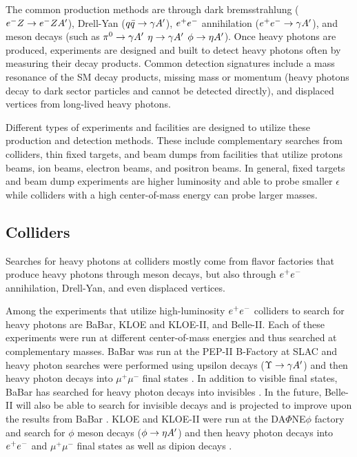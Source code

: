 The common production methods are through dark bremsstrahlung ($e^-Z \rightarrow e^- Z A^\prime$), Drell-Yan ($q\bar{q} \rightarrow \gamma A^\prime$), $e^{+}e^{-}$ annihilation ($e^{+}e^{-} \rightarrow \gamma A^\prime$), and meson decays (such as $\pi^0 \rightarrow \gamma A^\prime$ $\eta \rightarrow \gamma A^\prime$ $\phi \rightarrow \eta A^\prime$). Once heavy photons are produced, experiments are designed and built to detect heavy photons often by measuring their decay products. Common detection signatures include a mass resonance of the SM decay products, missing mass or momentum (heavy photons decay to dark sector particles and cannot be detected directly), and displaced vertices from long-lived heavy photons. 

Different types of experiments and facilities are designed to utilize these production and detection methods. These include complementary searches from colliders, thin fixed targets, and beam dumps from facilities that utilize protons beams, ion beams, electron beams, and positron beams. In general, fixed targets and beam dump experiments are higher luminosity and able to probe smaller $\epsilon$ while colliders with a high center-of-mass energy can probe larger masses.

\subsection{Colliders}\label{sec:colliders}

Searches for heavy photons at colliders mostly come from flavor factories that produce heavy photons through meson decays, but also through $e^{+}e^{-}$ annihilation, Drell-Yan, and even displaced vertices.

Among the experiments that utilize high-luminosity $e^{+}e^{-}$ colliders to search for heavy photons are BaBar, KLOE and KLOE-II, and Belle-II. Each of these experiments were run at different center-of-mass energies and thus searched at complementary masses. BaBar was run at the PEP-II B-Factory at SLAC and heavy photon searches were performed using upsilon decays ($\Upsilon \rightarrow \gamma A^\prime$) and then heavy photon decays into $\mu^+ \mu^-$ final states \cite{Aubert:2009cp}. In addition to visible final states, BaBar has searched for heavy photon decays into invisibles \cite{PhysRevLett.119.131804}. In the future, Belle-II will also be able to search for invisible decays and is projected to improve upon the results from BaBar \cite{pietro2018data}. KLOE and KLOE-II were run at the DA$\Phi$NE$\phi$ factory and search for $\phi$ meson decays ($\phi \rightarrow \eta A^\prime$) and then heavy photon decays into $e^{+}e^{-}$ and $\mu^+ \mu^-$ final states as well as dipion decays \cite{Babusci:2012cr} \cite{Archilli:2011zc} \cite{Mandaglio:2017kiv}.

